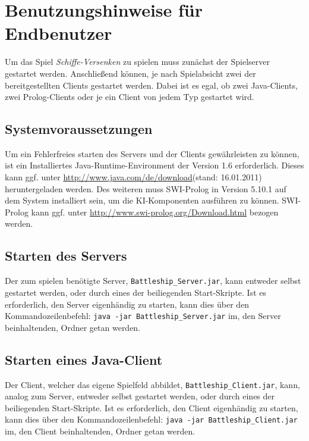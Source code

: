 \section{Benutzungshinweise für Endbenutzer} \label{sec:Endbenutzer}
	Um das Spiel \textit{Schiffe-Versenken} zu spielen muss zunächst der Spielserver gestartet werden. Anschließend können, je nach
	Spielabsicht zwei der bereitgestellten Clients gestartet werden. Dabei ist es egal, ob zwei Java-Clients, zwei Prolog-Clients oder
	je ein Client von jedem Typ gestartet wird. 
	
	\subsection{Systemvoraussetzungen} %
	\label{sub:systemvoraussetzungen}
		Um ein Fehlerfreies starten des Servers und der Clients gewährleisten zu können, ist ein Installiertes Java-Runtime-Environment 
		der Version 1.6 erforderlich. Dieses kann ggf. unter \url{http://www.java.com/de/download}(stand: 16.01.2011) heruntergeladen werden.
		\newline
		Des weiteren muss SWI-Prolog in Version 5.10.1 auf dem System installiert sein, um die KI-Komponenten ausführen zu können. SWI-Prolog 
		kann ggf. unter \url{http://www.swi-prolog.org/Download.html} bezogen werden.
	
\subsection{Starten des Servers}
	Der zum spielen benötigte Server, \texttt{Battleship\_Server.jar}, kann entweder selbst gestartet werden, oder 
	durch eines der beiliegenden Start-Skripte.
	Ist es erforderlich, den Server eigenhändig zu starten, kann dies über den Kommandozeilenbefehl:\newline
	\texttt{java -jar Battleship\_Server.jar}\newline
	im, den Server beinhaltenden, Ordner getan werden.

\subsection{Starten eines Java-Client}
	Der Client, welcher das eigene Spielfeld abbildet, \texttt{Battleship\_Client.jar}, kann, analog zum Server, entweder selbst gestartet werden, oder 
	durch eines der beiliegenden Start-Skripte.
	Ist es erforderlich, den Client eigenhändig zu starten, kann dies über den Kommandozeilenbefehl:\newline
	\texttt{java -jar Battleship\_Client.jar}\newline
	im, den Client beinhaltenden, Ordner getan werden.

